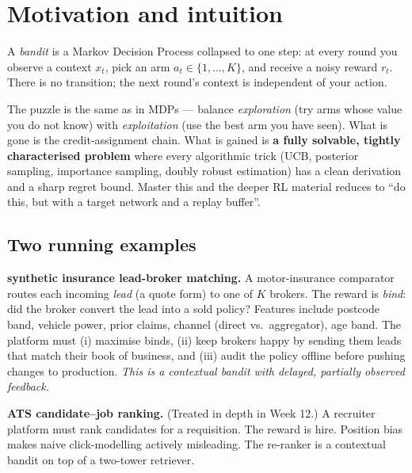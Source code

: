 \documentclass[11pt,oneside]{scrbook}
\begin{document}
\chapter{Motivation and intuition}

A \emph{bandit} is a Markov Decision Process collapsed to one step: at every
round you observe a context $x_t$, pick an arm $a_t \in \{1,\dots,K\}$, and
receive a noisy reward $r_t$. There is no transition; the next round's
context is independent of your action.

The puzzle is the same as in MDPs --- balance \emph{exploration} (try arms
whose value you do not know) with \emph{exploitation} (use the best arm you
have seen). What is gone is the credit-assignment chain. What is gained is
\textbf{a fully solvable, tightly characterised problem} where every
algorithmic trick (UCB, posterior sampling, importance sampling, doubly
robust estimation) has a clean derivation and a sharp regret bound. Master
this and the deeper RL material reduces to ``do this, but with a target
network and a replay buffer''.

\section{Two running examples}

\textbf{synthetic insurance lead-broker matching.} A motor-insurance comparator routes
each incoming \emph{lead} (a quote form) to one of $K$ brokers. The reward
is \emph{bind}: did the broker convert the lead into a sold policy?
Features include postcode band, vehicle power, prior claims, channel
(direct vs.\ aggregator), age band. The platform must (i) maximise binds,
(ii) keep brokers happy by sending them leads that match their book of
business, and (iii) audit the policy offline before pushing changes to
production. \emph{This is a contextual bandit with delayed, partially
observed feedback.}

\textbf{ATS candidate--job ranking.} (Treated in depth in Week 12.) A
recruiter platform must rank candidates for a requisition. The reward is
hire. Position bias makes naive click-modelling actively misleading. The
re-ranker is a contextual bandit on top of a two-tower retriever.
\end{document}
